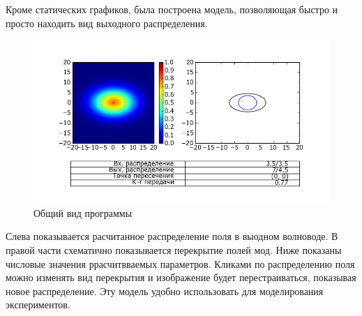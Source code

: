 Кроме статических графиков, была построена модель, позволяющая быстро и просто находить вид выходного распределения.

\begin{figure}[h!]
	\includegraphics[width=\linewidth]{img/heatmap.png}
	\caption{Общий вид программы}
\end{figure}

Слева показывается расчитанное распределение поля в выодном волноводе. В правой части схематично показывается перекрытие полей мод. Ниже показаны числовые значения ррасчитвваемых параметров. Кликами по распределению поля можно изменять вид перекрытия и изображение будет перестраиваться, показывая новое распределение. Эту модель удобно использовать для моделирования экспериментов.

